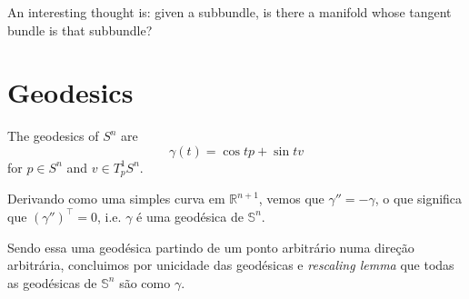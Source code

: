 An interesting thought is: given a subbundle, is there a manifold whose tangent
bundle is that subbundle?

\section{Geodesics}
\label{section-geodesics}

\begin{example}
\label{example-geodesics-of-Sn}
The geodesics of $S^n$ are 
\begin{equation}
\label{equation-geodesics-of-Sn}
\gamma(t)=\cos t p+\sin t v
\end{equation}
for $p \in S^n$ and $v\in T^1_pS^n$.

Derivando como uma simples curva em $\mathbb{R}^{n+1}$, vemos que
$\gamma''=-\gamma$, o que significa que $(\gamma'')^{\top}=0$, i.e. $\gamma$ é
uma geodésica de $\mathbb{S}^n$.

Sendo essa uma geodésica partindo de um ponto arbitrário numa direção
arbitrária, concluimos por unicidade das geodésicas e \textit{rescaling lemma}
que todas as geodésicas de $\mathbb{S}^n$ são como $\gamma$.
\end{example}

